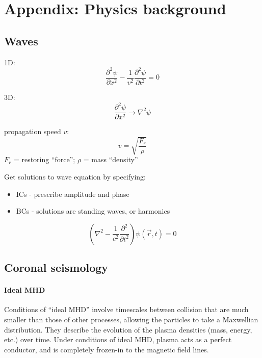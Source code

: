 



%
%
%
%


\clearpage
\section{Appendix: Physics background}


% 
\subsection{Waves}




1D:
\[
    \frac{\partial^{2}\psi}{\partial x^{2}}
    - \frac{1}{v^{2}}\frac{\partial^{2}\psi}{\partial t^{2}}
    = 0
    \]

3D:
\[
    \frac{\partial^{2}\psi}{\partial x^{2}} \rightarrow
    \nabla^{2}\psi
    \]


propagation speed $v$:
\[
    v = \sqrt{ \frac{F_{r}}{\rho}}
    \]
$F_{r}$ = restoring ``force'';
$\rho$ = mass ``density''

Get solutions to wave equation by specifying:
\begin{itemize}
    \item ICs - prescribe amplitude and phase
    \item BCs - solutions are standing waves, or harmonics
\end{itemize}


\[
    \left( \nabla^{2} - \frac{1}{c^{2}} \frac{\partial^{2}}{\partial t^{2}} \right)
    \psi\left( \vec{r},t \right)
    = 0
    \]









%

\subsection{Coronal seismology}\label{cs}

\paragraph{Ideal MHD}\label{idealMHD}
Conditions of ``ideal MHD'' involve timescales between collision that are much
smaller than those of other processes, allowing the particles to take a
Maxwellian distribution. They describe the evolution of the plasma densities
(mass, energy, etc.) over time. Under conditions of ideal MHD, plasma acts as a
perfect conductor, and is completely frozen-in to the magnetic field lines.

